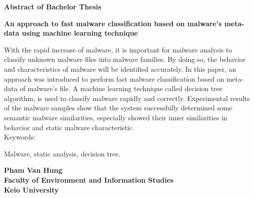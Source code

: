 \begin{center}


\begin{Large}
{\bf Abstract of Bachelor Thesis} \\

\vspace{5mm}

{\bf An approach to fast malware classification based on malware's meta-data using machine learning technique}
\end{Large}
\end{center}

\vspace{0.8cm}
 
  With the rapid increase of malware, it is important for malware analysis to classify unknown malware files into malware families. By doing so, the behavior and characteristics of malware will be identified accurately. In this paper, an approach was introduced to perform fast malware classification based on meta-data of malware's file. A machine learning technique called decision tree algorithm, is used to classify malware rapidly and correctly. Experimental results of the malware samples show that the system successfully determined some semantic malware similarities, especially showed their inner similarities in behavior and static malware characteristic.  \\

Keywords:

Malware, static analysis, decision tree.

\vspace{0.5cm}

\begin{flushright}
{\bf Pham Van Hung}\\
\vspace{2mm}
{\bf Faculty of Environment and Information Studies}\\
{\bf Keio University}\\
\end{flushright}